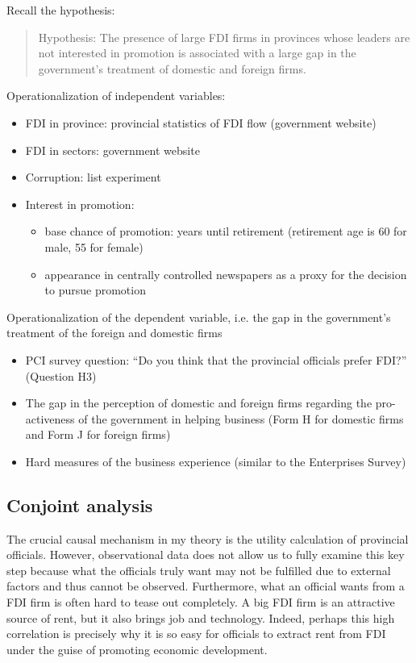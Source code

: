 Recall the hypothesis:

\begin{quote}
Hypothesis: The presence of large FDI firms in provinces whose leaders are not interested in promotion is associated with a large gap in the government's treatment of domestic and foreign firms.
\end{quote}

Operationalization of independent variables:
\begin{itemize}
\item FDI in province: provincial statistics of FDI flow (government website)
\item FDI in sectors: government website
\item Corruption: list experiment \citep{Malesky2015}
\item Interest in promotion: 
\begin{itemize}
	\item base chance of promotion: years until retirement (retirement age is 60 for male, 55 for female)
	\item appearance in centrally controlled newspapers as a proxy for the decision to pursue promotion
\end{itemize}
\end{itemize}

Operationalization of the dependent variable, i.e. the gap in the government's treatment of the foreign and domestic firms
\begin{itemize}
	\item PCI survey question: ``Do you think that the provincial officials prefer FDI?'' (Question H3)
	\item The gap in the perception of domestic and foreign firms regarding the pro-activeness of the government in helping business (Form H for domestic firms and Form J for foreign firms)
	\item Hard measures of the business experience (similar to the Enterprises Survey)
\end{itemize}

\subsection{Conjoint analysis}

The crucial causal mechanism in my theory is the utility calculation of provincial officials. However, observational data does not allow us to fully examine this key step because what the officials truly want may not be fulfilled due to external factors and thus cannot be observed. Furthermore, what an official wants from a FDI firm is often hard to tease out completely. A big FDI firm is an attractive source of rent, but it also brings job and technology. Indeed, perhaps this high correlation is precisely why it is so easy for officials to extract rent from FDI under the guise of promoting economic development.


